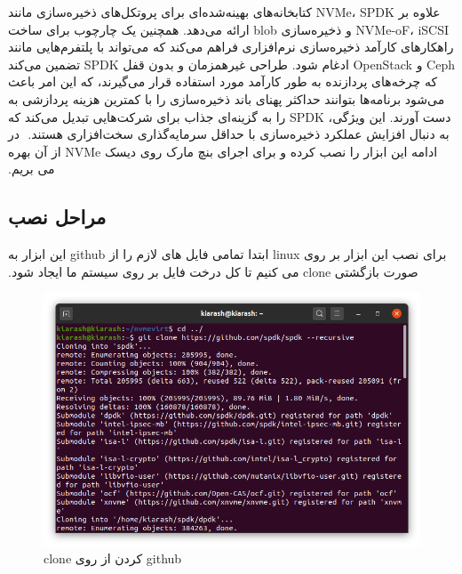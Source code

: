 ‫
‫علاوه بر NVMe، SPDK کتابخانه‌های بهینه‌شده‌ای برای پروتکل‌های ذخیره‌سازی مانند   NVMe-oF، iSCSI و ذخیره‌سازی blob ارائه می‌دهد. همچنین یک چارچوب برای ساخت راهکارهای کارآمد ذخیره‌سازی نرم‌افزاری فراهم می‌کند که می‌تواند با پلتفرم‌هایی مانند Ceph و OpenStack ادغام شود. طراحی غیرهمزمان و بدون قفل SPDK تضمین می‌کند که چرخه‌های پردازنده به طور کارآمد مورد استفاده قرار می‌گیرند، که این امر باعث می‌شود برنامه‌ها بتوانند حداکثر پهنای باند ذخیره‌سازی را با کمترین هزینه پردازشی به دست آورند. این ویژگی، SPDK را به گزینه‌ای جذاب برای شرکت‌هایی تبدیل می‌کند که به دنبال افزایش عملکرد ذخیره‌سازی با حداقل سرمایه‌گذاری سخت‌افزاری هستند.
‫
‫در ادامه این ابزار را نصب کرده و برای اجرای بنچ مارک روی دیسک NVMe از آن بهره می بریم.
‫
‫‫\subsection*{مراحل نصب}
‫برای نصب این ابزار بر روی linux ابتدا تمامی فایل های لازم را از github این ابزار به صورت بازگشتی clone می کنیم تا کل درخت فایل بر روی سیستم ما ایجاد شود.

\begin{figure}[H]
    \centering
    \includegraphics[width=\textwidth]{figs/gitclone.png}
    \caption{clone کردن از روی github}
\end{figure}


